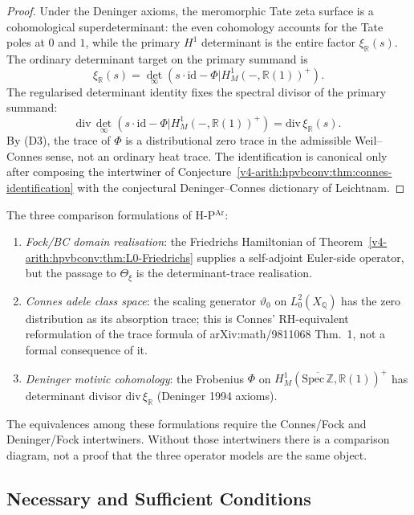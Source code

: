 \begin{proof}
Under the Deninger axioms, the meromorphic Tate zeta surface is a
cohomological superdeterminant: the even cohomology accounts for the
Tate poles at \(0\) and \(1\), while the primary \(H^{1}\) determinant
is the entire factor \(\xi_{\mathbb R}(s)\). The ordinary determinant
target on the primary summand is
\[
\xi_{\mathbb R}(s)=
\det_{\infty}(s\cdot\mathrm{id}-\Phi|H^{1}_{M}(-,\mathbb{R}(1))^{+}).
\]
The regularised determinant identity fixes the spectral divisor of the
primary summand:
\[
\mathrm{div}\,\det_{\infty}(s\cdot\mathrm{id}-\Phi|H^{1}_{M}(-,\mathbb{R}(1))^{+})
=\mathrm{div}\,\xi_{\mathbb R}(s).
\]
By (D3), the trace of \(\Phi\) is a distributional zero trace in the
admissible Weil--Connes sense, not an ordinary heat trace. The
identification is canonical only after composing the intertwiner of
Conjecture~\ref{v4-arith:hpvbconv:thm:connes-identification} with the
conjectural Deninger--Connes dictionary of Leichtnam.
\end{proof}

\begin{remark}
\label{v4-arith:hpvbconv:rem:three-formalisms}
The three comparison formulations of H-P\(^{\mathrm{Ar}}\):
\begin{enumerate}
\item \emph{Fock/BC domain realisation}: the Friedrichs Hamiltonian
of Theorem~\ref{v4-arith:hpvbconv:thm:L0-Friedrichs} supplies a self-adjoint
Euler-side operator, but the passage to \(\Theta_{\xi}\) is the
determinant-trace realisation.
\item \emph{Connes adele class space}: the scaling generator
\(\vartheta_{0}\) on \(L^{2}_{0}(X_{\mathbb{Q}})\) has the zero
distribution as its absorption trace; this is Connes'
RH-equivalent reformulation of the trace formula of
arXiv:math/9811068 Thm.~1, not a formal consequence of it.
\item \emph{Deninger motivic cohomology}: the Frobenius \(\Phi\) on
\(H^{1}_{M}(\overline{\mathrm{Spec}\,\mathbb{Z}},\mathbb{R}(1))^{+}\)
has determinant divisor \(\mathrm{div}\,\xi_{\mathbb R}\)
(Deninger 1994 axioms).
\end{enumerate}
The equivalences among these formulations require the Connes/Fock and
Deninger/Fock intertwiners. Without those intertwiners there is a
comparison diagram, not a proof that the three operator models are the
same object.
\end{remark}

\subsection{Necessary and Sufficient Conditions}
\label{v4-arith:hpvbconv:necessary-sufficient}

